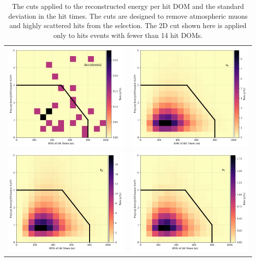 \begin{center}
\begin{table}
\begin{tabular}{cc}
    \includegraphics[width=0.45\linewidth]{pegleg_trms_ench_noise.png} &  
    \includegraphics[width=0.45\linewidth]{pegleg_trms_ench_genie_nue.png} \\  

    \includegraphics[width=0.45\linewidth]{pegleg_trms_ench_genie_numu.png} &  
    \includegraphics[width=0.45\linewidth]{pegleg_trms_ench_genie_nutau.png} \\ 
\end{tabular}
\label{fig:trms_ench}
\caption[The 2D cuts applied to the time and energy variables at Level 7]{The cuts applied to the reconstructed energy per hit DOM and the standard deviation in the hit times. The cuts are designed to remove atmospheric muons and highly scattered hits from the selection. The 2D cut shown here is applied only to hits events with fewer than 14 hit DOMs. }
\end{table}
\end{center}
